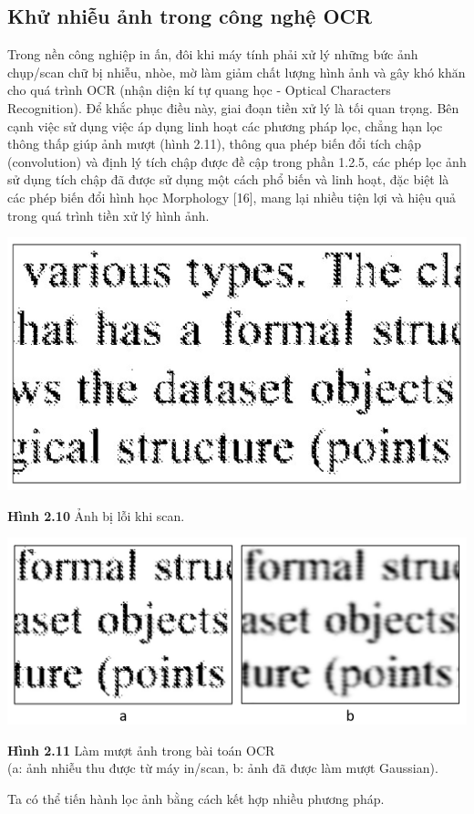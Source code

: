 \subsection{Khử nhiễu ảnh trong công nghệ OCR}
Trong nền công nghiệp in ấn, đôi khi máy tính phải xử lý những bức ảnh chụp/scan chữ bị nhiễu, nhòe, mờ làm giảm chất lượng hình ảnh và gây khó khăn cho quá trình OCR (nhận diện kí tự quang học - Optical Characters Recognition). Để khắc phục điều này, giai đoạn tiền xử lý là tối quan trọng. Bên cạnh việc sử dụng việc áp dụng linh hoạt các phương pháp lọc, chẳng hạn lọc thông thấp giúp ảnh mượt (hình 2.11), thông qua phép biến đổi tích chập (convolution) và định lý tích chập được đề cập trong phần 1.2.5, các phép lọc ảnh sử dụng tích chập đã được sử dụng một cách phổ biến và linh hoạt, đặc biệt là các phép biến đổi hình học Morphology [16], mang lại nhiều tiện lợi và hiệu quả trong quá trình tiền xử lý hình ảnh.
\begin{center}
    \includegraphics[scale=0.65]{Figures/fig15b.png}
    \par \textbf {Hình 2.10} Ảnh bị lỗi khi scan.
\end{center}
\begin{center}
    \includegraphics[scale=0.5]{Figures/fig11a.png}
    \par \textbf {Hình 2.11} Làm mượt ảnh trong bài toán OCR \\(a: ảnh nhiễu thu được từ máy in/scan, b: ảnh đã được làm mượt Gaussian).
\end{center}
Ta có thể tiến hành lọc ảnh bằng cách kết hợp nhiều phương pháp.

